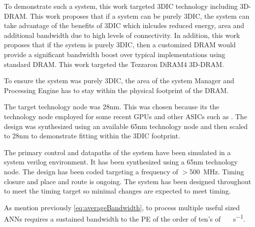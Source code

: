 \documentclass[journal]{IEEEtran}
\begin{document}
To demonstrate such a system, this work targeted 3DIC technology including 3D-DRAM. This work proposes that if a system can be purely 3DIC, the system can take advantage of the benefits
of 3DIC which inlcudes reduced energy, area and additional bandwidth due to high levels of connectivity.
In addition, this work proposes that if the system is purely 3DIC, then a customized DRAM would provide a significant bandwidth boost over typical implementations using standard DRAM.
This work targeted the Tezzaron DiRAM4 3D-DRAM.

To ensure the system was purely 3DIC, the area of the system Manager and Processing Engine has to stay within the physical footprint of the DRAM.

The target technology node was 28nm. This was chosen because its the technology node employed for some recent GPUs and other ASICs such as \cite{jouppi2017datacenter}.
The design was synthesized using an available 65nm technology node and then scaled to 28nm to demonstrate fitting within the 3DIC footprint.

The primary control and datapaths of the system have been simulated in a system verilog environment. It has been synthesized using a 65nm technology node.
The design has been coded targeting a frequency of $>$\SI{500}{\mega\hertz}. Timing closure and place and route is ongoing. The system has been designed throughout to meet the timing target so minimal changes are expected to meet timing.

As mention previously \eqref{eq:averageBandwidth}, to process multiple useful sized ANNs requires a sustained bandwidth to the PE of the order of ten's of \SI[per-mode=symbol]{}{\tera\bit\per\second}.
\end{document}
